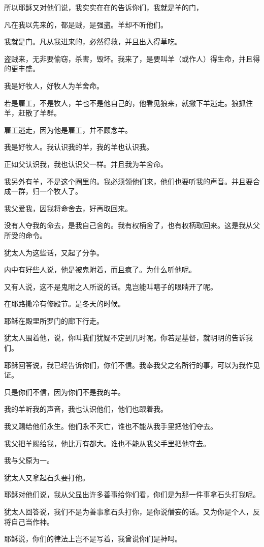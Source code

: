 \documentclass[12pt,oneside]{book}
\begin{document}
所以耶稣又对他们说，我实实在在的告诉你们，我就是羊的门，

凡在我以先来的，都是贼，是强盗。羊却不听他们。

我就是门。凡从我进来的，必然得救，并且出入得草吃。

盗贼来，无非要偷窃，杀害，毁坏。我来了，是要叫羊（或作人）得生命，并且得的更丰盛。

我是好牧人，好牧人为羊舍命。

若是雇工，不是牧人，羊也不是他自己的，他看见狼来，就撇下羊逃走。狼抓住羊，赶散了羊群。

雇工逃走，因为他是雇工，并不顾念羊。

我是好牧人。我认识我的羊，我的羊也认识我。

正如父认识我，我也认识父一样。并且我为羊舍命。

我另外有羊，不是这个圈里的。我必须领他们来，他们也要听我的声音。并且要合成一群，归一个牧人了。

我父爱我，因我将命舍去，好再取回来。

没有人夺我的命去，是我自己舍的。我有权柄舍了，也有权柄取回来。这是我从父所受的命令。

犹太人为这些话，又起了分争。

内中有好些人说，他是被鬼附着，而且疯了。为什么听他呢。

又有人说，这不是鬼附之人所说的话。鬼岂能叫瞎子的眼睛开了呢。

在耶路撒冷有修殿节。是冬天的时候。

耶稣在殿里所罗门的廊下行走。

犹太人围着他，说，你叫我们犹疑不定到几时呢。你若是基督，就明明的告诉我们。

耶稣回答说，我已经告诉你们，你们不信。我奉我父之名所行的事，可以为我作见证。

只是你们不信，因为你们不是我的羊。

我的羊听我的声音，我也认识他们，他们也跟着我。

我又赐给他们永生。他们永不灭亡，谁也不能从我手里把他们夺去。

我父把羊赐给我，他比万有都大。谁也不能从我父手里把他夺去。

我与父原为一。

犹太人又拿起石头要打他。

耶稣对他们说，我从父显出许多善事给你们看，你们是为那一件事拿石头打我呢。

犹太人回答说，我们不是为善事拿石头打你，是你说僭妄的话。又为你是个人，反将自己当作神。

耶稣说，你们的律法上岂不是写着，我曾说你们是神吗。
\end{document}
